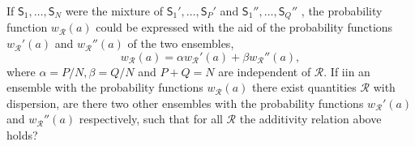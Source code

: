 \documentclass[a4paper]{article}
\theoremstyle{definition}
\theoremstyle{plain}
\begin{document}
\begin{enumerate}
\begin{enumerate}
                If $\mathsf S_1,\ldots,\mathsf S_N$ were the
                mixture of $\mathsf S_1',\ldots,\mathsf
                S_P'$ and $\mathsf S_1'',\ldots,\mathsf
                S_Q''$ , the probability function
                $w_{\mathcal{R}}(a)$ could be expressed with
                the aid of the probability functions
                $w_{\mathcal{R}}'(a)$ and
                $w_{\mathcal{R}}''(a)$ of the two ensembles,
                \begin{equation}
                    w_{\mathcal{R}}(a)
                    = \alpha w_{\mathcal{R}}'(a) + \beta
                    w_{\mathcal{R}}''(a),
                \end{equation}
                where $\alpha = P / N, \beta = Q/N$ and $P +
                Q = N$ are independent of $\mathcal{R}$. If
                iin an ensemble with the probability
                functions $w_\mathcal{R}(a)$ there exist
                quantities $\mathcal{R}$ with dispersion,
                are there two other ensembles with the
                probability functions $w_{\mathcal{R}}'(a)$ 
                and $w_{\mathcal{R}}''(a)$ respectively,
                such that for all $\mathcal{R}$ the
                additivity relation above holds?


\end{enumerate}
\end{enumerate}
\end{document}
